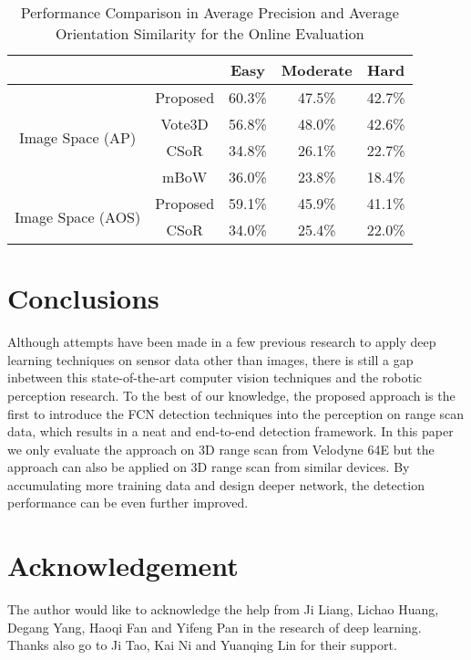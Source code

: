 \documentclass[conference]{IEEEtran}
\begin{document}
\begin{table}
    \centering
    \caption{Performance Comparison in Average Precision and Average Orientation Similarity for the Online Evaluation}
    \begin{tabular}{ccccc}
    \hline\hline
    & & Easy & Moderate & Hard \\
    \hline
    \multirow{4}{*}{Image Space (AP)} & Proposed & 60.3\% & 47.5\% & 42.7\% \\
    & Vote3D & 56.8\% & 48.0\% & 42.6\%\\
    & CSoR & 34.8\% & 26.1\% & 22.7\% \\
    & mBoW & 36.0\% & 23.8\% & 18.4\% \\
    \hline
    \multirow{2}{*}{Image Space (AOS)} & Proposed & 59.1\% & 45.9\% & 41.1\% \\
    & CSoR & 34.0\% & 25.4\% & 22.0\% \\
    \hline

    \end{tabular}
    \label{tab:online}
\end{table}

\section{Conclusions}
Although attempts have been made in a few previous research to apply deep learning techniques on sensor data other than images, there is still a gap inbetween this state-of-the-art computer vision techniques and the robotic perception research. To the best of our knowledge, the proposed approach is the first to introduce the FCN detection techniques into the perception on range scan data, which results in a neat and end-to-end detection framework. In this paper we only evaluate the approach on 3D range scan from Velodyne 64E but the approach can also be applied on 3D range scan from similar devices. By accumulating more training data and design deeper network, the detection performance can be even further improved. 

\section{Acknowledgement}
The author would like to acknowledge the help from Ji Liang, Lichao Huang, Degang Yang, Haoqi Fan and Yifeng Pan in the research of deep learning. Thanks also go to Ji Tao, Kai Ni and Yuanqing Lin for their support.



\end{document}
